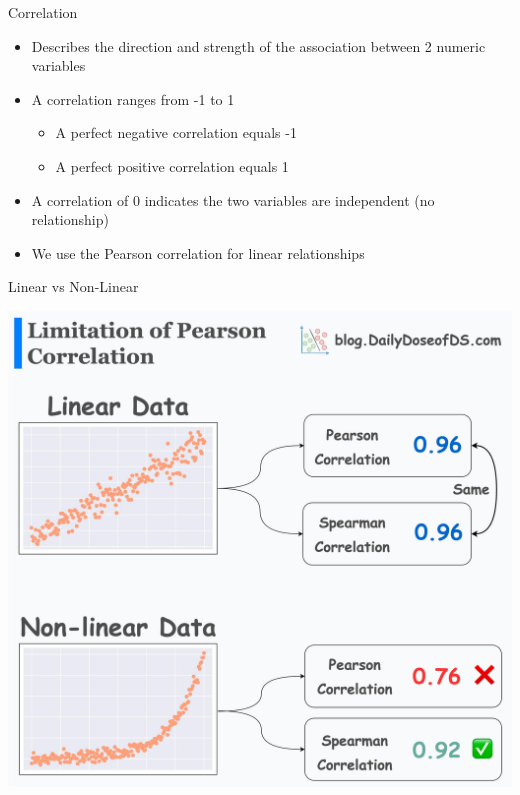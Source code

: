 \documentclass[
  ignorenonframetext,
]{beamer}
\providecommand{\tightlist}{%
  \setlength{\itemsep}{0pt}\setlength{\parskip}{0pt}}\usepackage{longtable,booktabs,array}
\begin{document}
\begin{frame}{Correlation}
\label{correlation}
\begin{itemize}
\tightlist
\item
  Describes the direction and strength of the association between 2
  numeric variables
\end{itemize}

\pause

\begin{itemize}
\item
  A correlation ranges from -1 to 1

  \begin{itemize}
  \item
    A perfect negative correlation equals -1
  \item
    A perfect positive correlation equals 1
  \end{itemize}
\end{itemize}

\pause

\begin{itemize}
\tightlist
\item
  A correlation of 0 indicates the two variables are independent (no
  relationship)
\end{itemize}

\pause

\begin{itemize}
\tightlist
\item
  We use the Pearson correlation for linear relationships
\end{itemize}
\end{frame}

\begin{frame}{Linear vs Non-Linear}
\label{linear-vs-non-linear}
\begin{center}
\includegraphics{class31_files/mediabag/linear-vs-nonlinear.jpg}
\end{center}
\end{frame}
\end{document}

